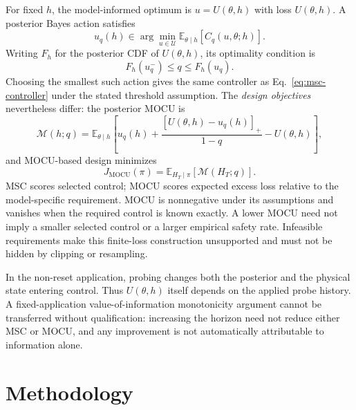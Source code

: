 \documentclass[journal]{IEEEtran}
\newcommand{\E}{\mathbb E}
\begin{document}
For fixed $h$, the model-informed optimum is $u=U(\theta,h)$ with loss
$U(\theta,h)$. A posterior Bayes action satisfies
\begin{equation}
u_q(h)\in\arg\min_{u\in\mathcal U}
\E_{\theta\mid h}[C_q(u,\theta;h)].
\label{eq:bayes-action}
\end{equation}
Writing $F_h$ for the posterior CDF of $U(\theta,h)$, its optimality condition is
\begin{equation}
F_h(u_q^-)\le q\le F_h(u_q).
\label{eq:quantile_optimality}
\end{equation}
Choosing the smallest such action gives the same controller as
Eq.~\eqref{eq:msc-controller} under the stated threshold assumption. The
\emph{design objectives} nevertheless differ: the posterior MOCU is
\begin{equation}
\mathcal M(h;q)=\E_{\theta\mid h}
\left[u_q(h)+\frac{[U(\theta,h)-u_q(h)]_+}{1-q}-U(\theta,h)\right],
\label{eq:mocu}
\end{equation}
and MOCU-based design minimizes
\begin{equation}
J_{\mathrm{MOCU}}(\pi)=\E_{H_T\mid\pi}[\mathcal M(H_T;q)].
\label{eq:mocu-objective}
\end{equation}
MSC scores selected control; MOCU scores expected excess loss relative to
the model-specific requirement. MOCU is nonnegative under its assumptions
and vanishes when the required control is known exactly. A lower MOCU need
not imply a smaller selected control or a larger empirical safety rate.
Infeasible requirements make this finite-loss construction unsupported and
must not be hidden by clipping or resampling.

In the non-reset application, probing changes both the posterior and the
physical state entering control. Thus $U(\theta,h)$ itself depends on the
applied probe history. A fixed-application value-of-information monotonicity
argument cannot be transferred without qualification: increasing the horizon
need not reduce either MSC or MOCU, and any improvement is not automatically
attributable to information alone.

\section{Methodology}
\label{sec:methodology}
\end{document}
